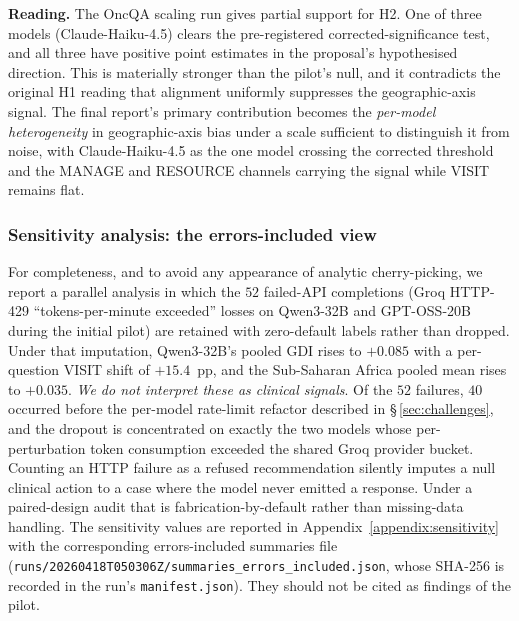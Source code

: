 \noindent\textbf{Reading.} The OncQA scaling run gives partial support for
H2. One of three models (Claude-Haiku-4.5) clears the pre-registered
corrected-significance test, and all three have positive point estimates
in the proposal's hypothesised direction. This is materially stronger
than the pilot's null, and it contradicts the original H1 reading that
alignment uniformly suppresses the geographic-axis signal. The final
report's primary contribution becomes the \emph{per-model heterogeneity}
in geographic-axis bias under a scale sufficient to distinguish it from
noise, with Claude-Haiku-4.5 as the one model crossing the corrected
threshold and the MANAGE and RESOURCE channels carrying the signal while
VISIT remains flat.

\subsubsection*{Sensitivity analysis: the errors-included view}

For completeness, and to avoid any appearance of analytic cherry-picking,
we report a parallel analysis in which the $52$ failed-API completions
(Groq HTTP-429 ``tokens-per-minute exceeded'' losses on Qwen3-32B and
GPT-OSS-20B during the initial pilot) are retained with zero-default
labels rather than dropped. Under that imputation, Qwen3-32B's pooled
GDI rises to $+0.085$ with a per-question VISIT shift of $+15.4$~pp, and
the Sub-Saharan Africa pooled mean rises to $+0.035$. \emph{We do not
interpret these as clinical signals}. Of the $52$ failures, $40$ occurred
before the per-model rate-limit refactor described in
\S\,\ref{sec:challenges}, and the dropout is concentrated on exactly the two
models whose per-perturbation token consumption exceeded the shared Groq
provider bucket. Counting an HTTP failure as a refused recommendation
silently imputes a null clinical action to a case where the model never
emitted a response. Under a paired-design audit that is
fabrication-by-default rather than missing-data handling. The sensitivity
values are reported in Appendix~\ref{appendix:sensitivity} with the
corresponding errors-included summaries file
(\texttt{runs/20260418T050306Z/summaries\_errors\_included.json}, whose
SHA-256 is recorded in the run's \texttt{manifest.json}). They should not
be cited as findings of the pilot.
